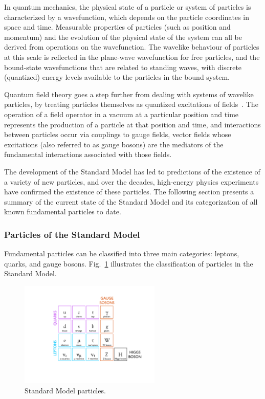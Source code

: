 In quantum mechanics, the physical state of a particle or system of particles is characterized by a wavefunction, which depends on the particle coordinates in space and time. Measurable properties of particles (such as position and momentum) and the evolution of the physical state of the system can all be derived from operations on the wavefunction. The wavelike behaviour of particles at this scale is reflected in the plane-wave wavefunction for free particles, and the bound-state wavefunctions that are related to standing waves, with discrete (quantized) energy levels available to the particles in the bound system.

Quantum field theory goes a step further from dealing with systems of wavelike particles, by treating particles themselves as quantized excitations of fields~\cite{PeskinSchroederPhysics}. The operation of a field operator in a vacuum at a particular position and time represents the production of a particle at that position and time, and interactions between particles occur via couplings to gauge fields, vector fields whose excitations (also referred to as gauge bosons) are the mediators of the fundamental interactions associated with those fields.

The development of the Standard Model has led to predictions of the existence of a variety of new particles, and over the decades, high-energy physics experiments have confirmed the existence of these particles. The following section presents a summary of the current state of the Standard Model and its categorization of all known fundamental particles to date.

\subsubsection{Particles of the Standard Model\label{sec:SM-particles}}

Fundamental particles can be classified into three main categories: leptons, quarks, and gauge bosons. Fig.~\ref{fig:StandardModelTable} illustrates the classification of particles in the Standard Model.

\begin{figure}
   \begin{center}
      \includegraphics[width=0.6\textwidth]{figures/StandardModelTable}
      \caption{Standard Model particles.}
      \label{fig:StandardModelTable}
   \end{center}
\end{figure}


